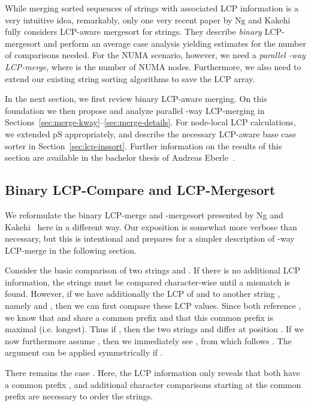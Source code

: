 \documentclass[a4paper]{myjournal}
\begin{document}
While merging sorted sequences of strings with associated LCP information is a
very intuitive idea, remarkably, only one very recent paper by Ng and
Kakehi~\cite{ng2008merging} fully considers LCP-aware mergesort for
strings. They describe \emph{binary} LCP-merge\-sort and perform an average case
analysis yielding estimates for the number of comparisons needed. For the NUMA
scenario, however, we need a \emph{parallel -way LCP-merge}, where  is
the number of NUMA nodes.  Furthermore, we also need to extend our existing
string sorting algorithms to save the LCP array.

In the next section, we first review binary LCP-aware merging. On this
foundation we then propose and analyze parallel -way LCP-merging in
Sections~\ref{sec:merge-kway}--\ref{sec:merge-details}. For node-local LCP
calculations, we extended pS appropriately, and describe the necessary
LCP-aware base case sorter in Section~\ref{sec:lcp-inssort}. Further information
on the results of this section are available in the bachelor thesis of Andreas
Eberle~\cite{eberle2014parallel}.

\subsection{Binary LCP-Compare and LCP-Mergesort}\label{sec:mergesort-binary}

We reformulate the binary LCP-merge and -mergesort presented by Ng and
Ka\-ke\-hi~\cite{ng2008merging} here in a different way. Our exposition is somewhat
more verbose than necessary, but this is intentional and prepares for a simpler
description of -way LCP-merge in the following section.

Consider the basic comparison of two strings  and . If there is no
additional LCP information, the strings must be compared character-wise until a
mismatch is found. However, if we have additionally the LCP of  and 
to another string , namely  and , then we can first
compare these LCP values. Since both reference , we know that  and 
share a common prefix  and that this common
prefix is maximal (i.e. longest). Thus if , then the
two strings  and  differ at position . If we
now furthermore assume , then we immediately see , from which follows . The argument can be
applied symmetrically if .

There remains the case . Here, the LCP information
only reveals that both have a common prefix , and additional
character comparisons starting at the common prefix are necessary to order the
strings.
\end{document}
